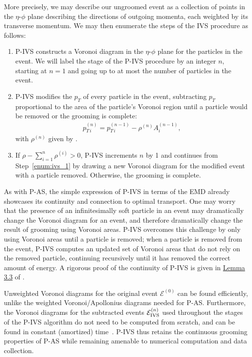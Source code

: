 More precisely, we may describe our ungroomed event as a collection of points in the \(\eta\)-\(\phi\) plane describing the directions of outgoing momenta, each weighted by its transverse momentum.
%
We may then enumerate the steps of the IVS procedure as follows:
%
\begin{enumerate}
    \item
    P-IVS constructs a Voronoi diagram in the \(\eta\)-\(\phi\) plane for the particles in the event.
    We will label the stage of the P-IVS procedure by an integer \(n\), starting at \(n = 1\) and going up to at most the number of particles in the event.
    \label{enum:ivs_1}

    \item
    P-IVS modifies the \(p_T\) of every particle in the event, subtracting \(p_T\) proportional to the area of the particle's Voronoi region until a particle would be removed or the grooming is complete:
    \begin{align}
	\label{eqn:ivs_2}
	p_{T\,i}^{(n)} = p_{T\,i}^{(n-1)} - \rho^{(n)} A^{(n-1)}_i,
    \end{align}
    with \(\rho^{(n)}\) given by .
    \label{enum:ivs_2}

    \item
    If \(\rho - \sum_{i = 1}^n \rho^{(i)} > 0\), P-IVS increments \(n\) by 1 and continues from Step~\ref{enum:ivs_1} by drawing a new Voronoi diagram for the modified event with a particle removed.
    Otherwise, the grooming is complete.
    \label{enum:ivs_3}
\end{enumerate}

As with P-AS, the simple expression of P-IVS in terms of the EMD already showcases its continuity and connection to optimal transport.
%
One may worry that the presence of an infinitesimally soft particle in an event may dramatically change the Voronoi diagram for an event, and therefore dramatically change the result of grooming using Voronoi areas.
%
P-IVS overcomes this challenge by only using Voronoi areas until a particle is removed;
%
when a particle is removed from the event, P-IVS computes an updated set of Voronoi areas that do not rely on the removed particle, continuing recursively until it has removed the correct amount of energy.
%
A rigorous proof of the continuity of P-IVS is given in \href{https://arxiv.org/pdf/1706.07403.pdf#page=15&zoom=100,0,200}{Lemma 3.3} of .

Unweighted Voronoi diagrams for the original event \(\mathcal{E}^{(0)}\) can be found efficiently, unlike the weighted Voronoi/Apollonius diagrams needed for P-AS.
%
Furthermore, the Voronoi diagrams for the subtracted events \(\mathcal{E}^{(n)}_{\rm IVS}\) used throughout the stages of the P-IVS algorithm do not need to be computed from scratch, and can be found in constant (amortized) time~\cite{Komiske:2020qhg}.
%
P-IVS thus retains the continuous grooming properties of P-AS while remaining amenable to numerical computation and data collection.


